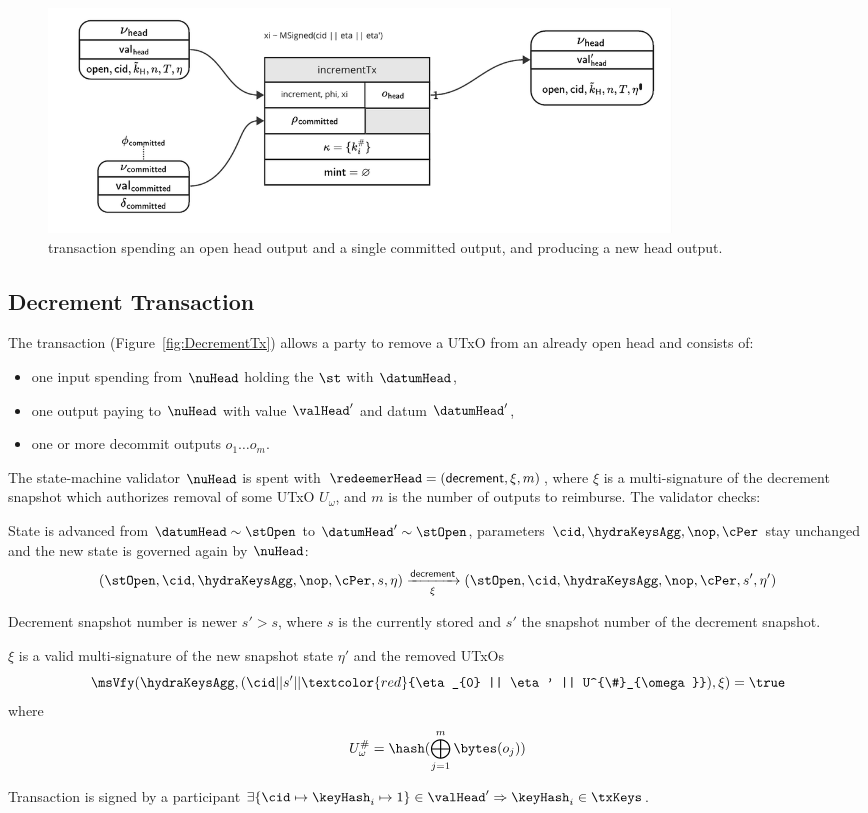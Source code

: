 \begin{figure}[h] \centering
	\includegraphics[width=0.8\textwidth]{figures/incrementTx.pdf}
	\caption{\mtxIncrement{} transaction spending an open head output and a single
		committed output, and producing a new head output.}\label{fig:incrementTx}
\end{figure}

\newpage

\subsection{Decrement Transaction}\label{sec:increment-tx}

\noindent The \mtxDecrement{} transaction (Figure~\ref{fig:DecrementTx}) allows
a party to remove a UTxO from an already open head and consists of:

\begin{itemize}
	\item one input spending from $\nuHead$ holding the $\st$ with $\datumHead$,
	\item one output paying to $\nuHead$ with value $\valHead'$ and
	      datum $\datumHead'$,
	\item one or more decommit outputs $o_{1} \dots o_{m}$.
\end{itemize}

\noindent The state-machine validator $\nuHead$ is spent with
$\redeemerHead = (\mathsf{decrement}, \xi, m)$, where $\xi$ is a multi-signature of
the decrement snapshot which authorizes removal of some UTxO $U_\omega$, and $m$ is
the number of outputs to reimburse. The validator checks:
\begin{menumerate}
	\item State is advanced from $\datumHead \sim \stOpen$ to
	$\datumHead' \sim \stOpen$, parameters $\cid,\hydraKeysAgg,\nop,\cPer$ stay
	unchanged and the new state is governed again by $\nuHead$:
	\[
		(\stOpen,\cid,\hydraKeysAgg,\nop,\cPer,s,\eta) \xrightarrow[\xi]{\mathsf{decrement}} (\stOpen,\cid,\hydraKeysAgg,\nop,\cPer,s',\eta')
	\]
	\item Decrement snapshot number is newer $s' > s$, where $s$ is the
	currently stored and $s'$ the snapshot number of the decrement snapshot.
	\item $\xi$ is a valid multi-signature of the new snapshot state $\eta'$ and the
	removed UTxOs
	\[
		\msVfy(\hydraKeysAgg,(\cid || s' || \textcolor{red}{\eta_{0} || \eta' || U^{\#}_{\omega}}),\xi) = \true
	\]
	where
	\[
		U^{\#}_{\omega}  = \hash(\bigoplus_{j=1}^{m} \bytes(o_{j}))
	\]
	\item Transaction is signed by a participant $\exists \{\cid \mapsto \keyHash_{i} \mapsto 1\} \in \valHead' \Rightarrow \keyHash_{i} \in \txKeys$.
\end{menumerate}

